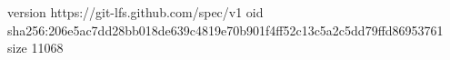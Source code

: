 version https://git-lfs.github.com/spec/v1
oid sha256:206e5ac7dd28bb018de639c4819e70b901f4ff52c13c5a2c5dd79ffd86953761
size 11068
